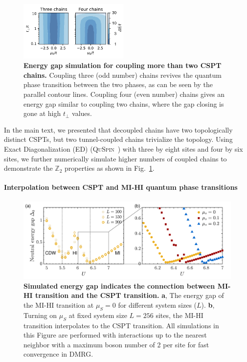 \documentclass[preprint,superscriptaddress,floatfix, nofootinbib]{revtex4-2}
\begin{document}
\begin{figure}
    \centering
    \includegraphics[width=0.48\textwidth]{figures/three_or_more_coupled_chains.pdf}
    \caption{\textbf{Energy gap simulation for coupling more than two CSPT chains.} Coupling three (odd number) chains revives the quantum phase transition between the two phases, as can be seen by the parallel contour lines. Coupling four (even number) chains gives an energy gap similar to coupling two chains, where the gap closing is gone at high $t_\perp$ values.
    }
    \label{fig: three_or_more_coupled_chains}
\end{figure}

In the main text, we presented that decoupled chains have two topologically distinct CSPTs, but two tunnel-coupled chains trivialize the topology. Using Exact Diagonalization (ED) (\textsc{QuSpin}~\cite{QuSpin}) with three by eight sites and four by six sites, we further numerically simulate higher numbers of coupled chains to demonstrate the $\mathbb{Z}_2$ properties as shown in Fig.~\ref{fig: three_or_more_coupled_chains}.

\paragraph*{Interpolation between CSPT and MI-HI quantum phase transitions}

\begin{figure}
    \centering
    \includegraphics[width=\textwidth]{figures/HI_to_CSPT_transition_large_size.pdf}
    \caption{\textbf{Simulated energy gap indicates the connection between MI-HI transition and the CSPT transition.} \textbf{a}, The energy gap of the MI-HI transition at $\mu_S=0$ for different system sizes ($L$). \textbf{b}, Turning on $\mu_S$ at fixed system size $L=256$ sites, the MI-HI transition interpolates to the CSPT transition. All simulations in this Figure are performed with interactions up to the nearest neighbor with a maximum boson number of 2 per site for fast convergence in DMRG.
    }
    \label{fig: HI_to_CSPT_transition_large_size}
\end{figure}
\end{document}
